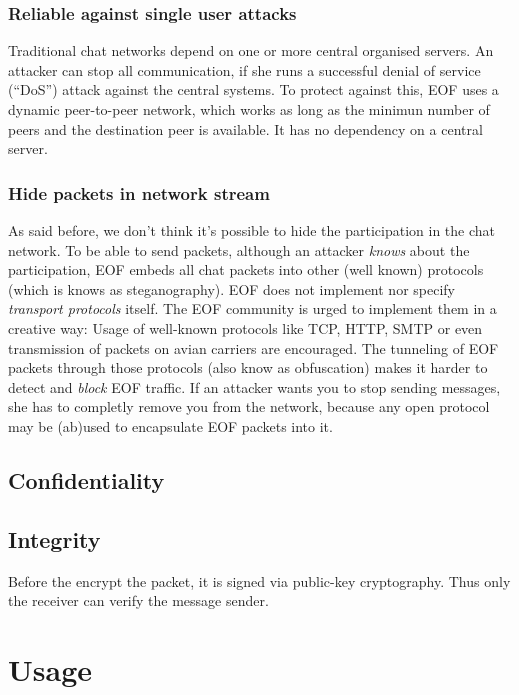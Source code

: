 \subsubsection{Reliable against single user attacks}
Traditional chat networks depend on one or more central organised servers.
An attacker can stop all communication, if she runs a successful denial
of service ("`DoS"') attack against the central systems.
To protect against this, EOF uses a dynamic peer-to-peer network, which works
as long as the minimun number of peers and the destination peer is available.
It has no dependency on a central server.

\subsubsection{Hide packets in network stream}
As said before, we don't think it's possible to hide the participation in the
chat network. To be able to send packets, although an attacker \emph{knows}
about the participation, EOF embeds all chat packets into other (well known)
protocols (which is knows as steganography\cite{stegano-1}).
EOF does not implement nor specify \emph{transport protocols} itself.
The EOF community is urged to implement them in a creative way: Usage
of well-known protocols like TCP\cite{tcp-1}, HTTP\cite{http-1},
SMTP\cite{smtp-1} or even transmission of packets on avian
carriers\cite{avian-1} are encouraged. The tunneling of EOF packets through
those protocols (also know as obfuscation) makes it harder to detect
and \emph{block} EOF traffic. 
If an attacker wants you to stop sending messages, she has to completly
remove you from the network, because any open protocol may be (ab)used to
encapsulate EOF packets into it.




\subsection{Confidentiality}

\subsection{Integrity}
Before the encrypt the packet, it is signed via public-key
cryptography\cite{pgp-1}. Thus only the receiver can verify the message sender.


\section{Usage}


